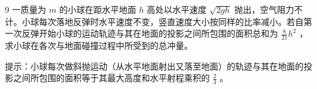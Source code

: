 \begin{problem}[第30届全国中学生物理竞赛决赛][小球反弹与冲量]{9}
一质量为 $m$ 的小球在距水平地面 $h$ 高处以水平速度 $\sqrt{2gh}$ 抛出，空气阻力不计。小球每次落地反弹时水平速度不变，竖直速度大小按同样的比率减小。若自第一次反弹开始小球的运动轨迹与其在地面的投影之间所包围的面积总和为 $\frac{8}{21}h^{2}$ ，求小球在各次与地面碰撞过程中所受到的总冲量。

提示：小球每次做斜抛运动（从水平地面射出又落至地面）的轨迹与其在地面的投影之间所包围的面积等于其最大高度和水平射程乘积的 $\frac{2}{3}$ 。
\end{problem}